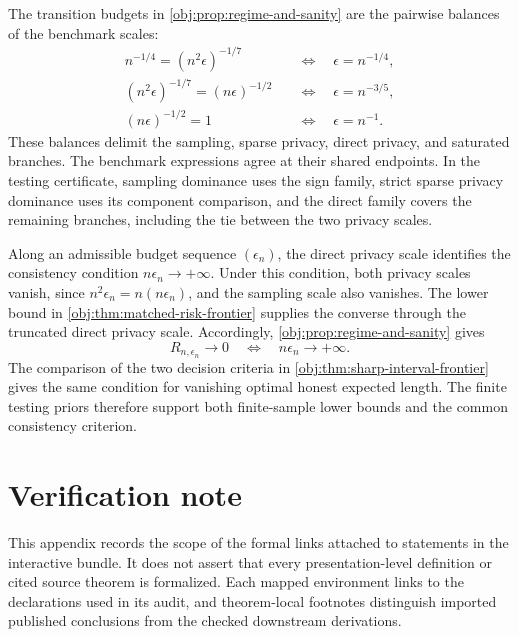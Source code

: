 \documentclass[11pt]{article}
\begin{document}
The transition budgets in \cref{obj:prop:regime-and-sanity} are the pairwise balances of the benchmark scales:
\[
\begin{aligned}
n^{-1/4}=(n^2\epsilon)^{-1/7}
&\quad\Longleftrightarrow\quad \epsilon=n^{-1/4},\\
(n^2\epsilon)^{-1/7}=(n\epsilon)^{-1/2}
&\quad\Longleftrightarrow\quad \epsilon=n^{-3/5},\\
(n\epsilon)^{-1/2}=1
&\quad\Longleftrightarrow\quad \epsilon=n^{-1}.
\end{aligned}
\]
These balances delimit the sampling, sparse privacy, direct privacy, and saturated branches. The benchmark expressions agree at their shared endpoints. In the testing certificate, sampling dominance uses the sign family, strict sparse privacy dominance uses its component comparison, and the direct family covers the remaining branches, including the tie between the two privacy scales.

Along an admissible budget sequence \((\epsilon_n)\), the direct privacy scale identifies the consistency condition \(n\epsilon_n\to+\infty\). Under this condition, both privacy scales vanish, since \(n^2\epsilon_n=n(n\epsilon_n)\), and the sampling scale also vanishes. The lower bound in \cref{obj:thm:matched-risk-frontier} supplies the converse through the truncated direct privacy scale. Accordingly, \cref{obj:prop:regime-and-sanity} gives
\[
R_{n,\epsilon_n}\longrightarrow0
\quad\Longleftrightarrow\quad
n\epsilon_n\longrightarrow+\infty.
\]
The comparison of the two decision criteria in \cref{obj:thm:sharp-interval-frontier} gives the same condition for vanishing optimal honest expected length. The finite testing priors therefore support both finite-sample lower bounds and the common consistency criterion.


\section{Verification note}

This appendix records the scope of the formal links attached to statements in the interactive bundle. It does not assert that every presentation-level definition or cited source theorem is formalized. Each mapped environment links to the declarations used in its audit, and theorem-local footnotes distinguish imported published conclusions from the checked downstream derivations.
\end{document}
